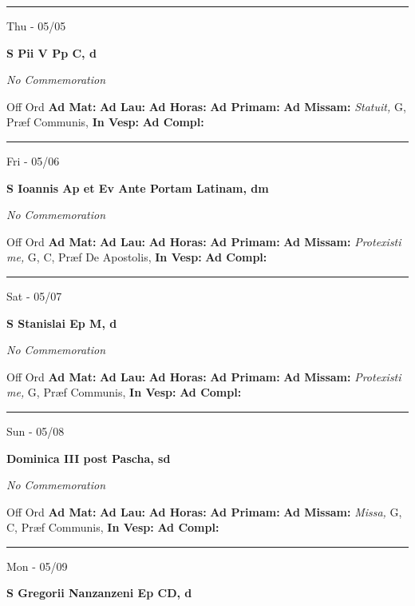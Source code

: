 \documentclass[letterpaper, 10pt]{article}
\begin{document}
\hrule
\begin{center}
Thu - 05/05
\end{center}\textbf{ \large S Pii V Pp C, \textnormal{\normalsize d}}

\textit{No Commemoration}\begin{justify}
Off Ord
\textbf{Ad Mat: }
\textbf{Ad Lau: }
\textbf{Ad Horas: }
\textbf{Ad Primam: }
\textbf{Ad Missam:} \textit{Statuit, } G, Præf Communis, 
\textbf{In Vesp: }
\textbf{Ad Compl: }\end{justify}



\hrule
\begin{center}
Fri - 05/06
\end{center}\textbf{ \large S Ioannis Ap et Ev Ante Portam Latinam, \textnormal{\normalsize dm}}

\textit{No Commemoration}\begin{justify}
Off Ord
\textbf{Ad Mat: }
\textbf{Ad Lau: }
\textbf{Ad Horas: }
\textbf{Ad Primam: }
\textbf{Ad Missam:} \textit{Protexisti me, } G, C, Præf De Apostolis, 
\textbf{In Vesp: }
\textbf{Ad Compl: }\end{justify}



\hrule
\begin{center}
Sat - 05/07
\end{center}\textbf{ \large S Stanislai Ep M, \textnormal{\normalsize d}}

\textit{No Commemoration}\begin{justify}
Off Ord
\textbf{Ad Mat: }
\textbf{Ad Lau: }
\textbf{Ad Horas: }
\textbf{Ad Primam: }
\textbf{Ad Missam:} \textit{Protexisti me, } G, Præf Communis, 
\textbf{In Vesp: }
\textbf{Ad Compl: }\end{justify}



\hrule
\begin{center}
Sun - 05/08
\end{center}\textbf{ \large Dominica III post Pascha, \textnormal{\normalsize sd}}

\textit{No Commemoration}\begin{justify}
Off Ord
\textbf{Ad Mat: }
\textbf{Ad Lau: }
\textbf{Ad Horas: }
\textbf{Ad Primam: }
\textbf{Ad Missam:} \textit{Missa, } G, C, Præf Communis, 
\textbf{In Vesp: }
\textbf{Ad Compl: }\end{justify}



\hrule
\begin{center}
Mon - 05/09
\end{center}\textbf{ \large S Gregorii Nanzanzeni Ep CD, \textnormal{\normalsize d}}
\end{document}
